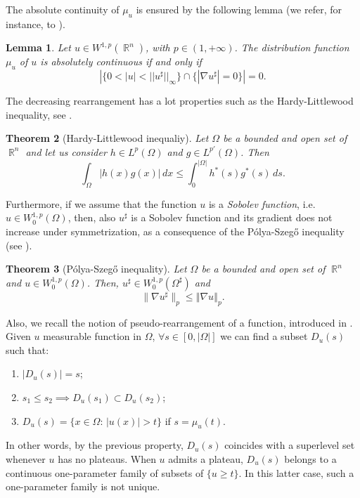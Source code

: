 \documentclass[oneside,a4paper,11pt,notitlepage]{article}
\newcommand{\abs}[1]{{\left|#1\right|}}
\newcommand{\norma}[1]{{\left\Vert#1\right\Vert}}
\theoremstyle{definition}
\theoremstyle{plain}
\newtheorem{theorem}{Theorem}[section]
\newtheorem{lemma}[theorem]{Lemma}
\theoremstyle{definition}
\DeclareMathOperator{\R}{\mathbb{R}}
\begin{document}
The absolute continuity of $\mu_u$ is ensured by the following lemma (we refer, for instance, to \cite{BZ,CF2}).

\begin{lemma}

Let $u\in W^{1,p}(\R^n)$, with $p\in(1,+\infty)$. The distribution function $\mu_u$ of $u$ is absolutely continuous if and only if 
\begin{equation*}
    \abs{\{0<\abs{u}<  ||u^\sharp||_\infty\}\cap \{|\nabla u^\sharp| =0\}}=0.
\end{equation*}

\end{lemma}

The decreasing rearrangement has a lot properties such as the Hardy-Littlewood inequality, see \cite{HLP}. 

\begin{theorem}[Hardy-Littlewood inequaliy]
Let $\Omega $ be a bounded and open set of $\R^n$ and let us consider $h\in L^p(\Omega)$ and $g\in L^{p'}(\Omega)$. Then 
    \begin{equation*}
 \int_{\Omega} \abs{h(x)g(x)} \, dx \le \int_{0}^{\abs{\Omega}} h^*(s) g^*(s) \, ds.
\end{equation*}
\end{theorem}
Furthermore, if we assume that the function $u$ is a \emph{Sobolev function}, i.e. $u\in W^{1,p}_0(\Omega)$, then, also $u^\sharp$ is a Sobolev function and its gradient does not increase under symmetrization, as a consequence of the  P\'olya-Szegő inequality (see \cite{PS}).
\begin{theorem}[P\'olya-Szegő inequality]
Let $\Omega $ be a bounded and open set of $\R^n$ and 
     $u \in W^{1,p}_0(\Omega)$. Then, $u^{\sharp} \in W^{1,p}_0(\Omega^\sharp)$ and
	\begin{equation}\label{poliaszego}
		\lVert \nabla u^{\sharp} \rVert_{p} \leq \norma{\nabla u}_{p}.
	\end{equation}
\end{theorem}
Also, we recall the notion of pseudo-rearrangement of a function, introduced in \cite{AT}. Given $u$ measurable function in $\Omega$, $\forall s  \in [0, |\Omega|]$ we can find a subset $D_u(s)$ such that:
    \begin{enumerate}
        \item $|D_u(s)|=s$;
        \item  $s_1 \leq s_2
        \implies D_u(s_1)\subset D_u(s_2)$;
        \item $D_u(s)= \{x \in \Omega : \, |u(x)| >t\}$ if $s = \mu_u(t)$.
    \end{enumerate}
In other words, by the previous property, $D_u(s)$ coincides with a superlevel set whenever $u$ has no plateaus. When $u$ admits a plateau, $D_u(s)$ belongs to a continuous one-parameter family of subsets of $\{u \ge t\}$. In this latter case, such a one-parameter family is not unique.
    
\end{document}
